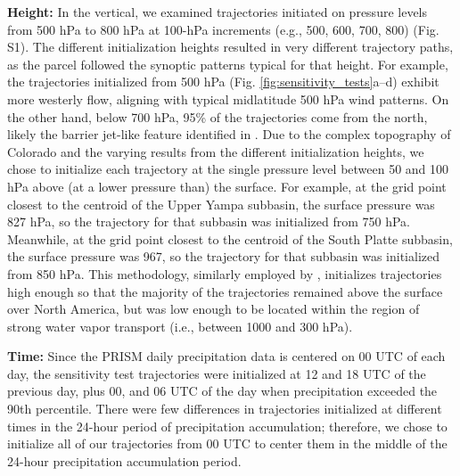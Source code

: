 \documentclass[draft]{agujournal2019}
\begin{document}
\textbf{Height:} In the vertical, we examined trajectories initiated on pressure levels from 500 hPa to 800 hPa at 100-hPa increments (e.g., 500, 600, 700, 800) (Fig. S1). The different initialization heights resulted in very different trajectory paths, as the parcel followed the synoptic patterns typical for that height. For example, the trajectories initialized from 500 hPa (Fig. \ref{fig:sensitivity_tests}a--d) exhibit more westerly flow, aligning with typical midlatitude 500 hPa wind patterns. On the other hand, below 700 hPa, 95\% of the trajectories come from the north, likely the barrier jet-like feature identified in . Due to the complex topography of Colorado and the varying results from the different initialization heights, we chose to initialize each trajectory at the single pressure level between 50 and 100 hPa above (at a lower pressure than) the surface. For example, at the grid point closest to the centroid of the Upper Yampa subbasin, the surface pressure was 827 hPa, so the trajectory for that subbasin was initialized from 750 hPa. Meanwhile, at the grid point closest to the centroid of the South Platte subbasin, the surface pressure was 967, so the trajectory for that subbasin was initialized from 850 hPa. This methodology, similarly employed by , initializes trajectories high enough so that the majority of the trajectories remained above the surface over North America, but was low enough to be located within the region of strong water vapor transport (i.e., between 1000 and 300 hPa). 

\textbf{Time:} Since the PRISM daily precipitation data is centered on 00 UTC of each day, the sensitivity test trajectories were initialized at 12 and 18 UTC of the previous day, plus 00, and 06 UTC of the day when precipitation exceeded the 90th percentile. There were few differences in trajectories initialized at different times in the 24-hour period of precipitation accumulation; therefore, we chose to initialize all of our trajectories from 00 UTC to center them in the middle of the 24-hour precipitation accumulation period. 
\end{document}
